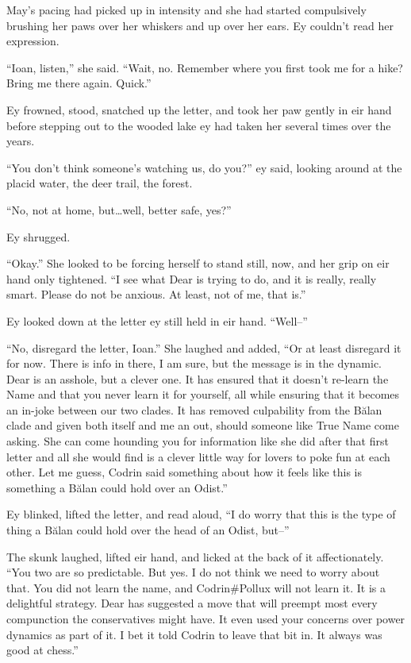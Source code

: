 May's pacing had picked up in intensity and she had started compulsively brushing her paws over her whiskers and up over her ears. Ey couldn't read her expression.

``Ioan, listen,'' she said. ``Wait, no. Remember where you first took me for a hike? Bring me there again. Quick.''

Ey frowned, stood, snatched up the letter, and took her paw gently in eir hand before stepping out to the wooded lake ey had taken her several times over the years.

``You don't think someone's watching us, do you?'' ey said, looking around at the placid water, the deer trail, the forest.

``No, not at home, but\ldots well, better safe, yes?''

Ey shrugged.

``Okay.'' She looked to be forcing herself to stand still, now, and her grip on eir hand only tightened. ``I see what Dear is trying to do, and it is really, really smart. Please do not be anxious. At least, not of me, that is.''

Ey looked down at the letter ey still held in eir hand. ``Well--''

``No, disregard the letter, Ioan.'' She laughed and added, ``Or at least disregard it for now. There is info in there, I am sure, but the message is in the dynamic. Dear is an asshole, but a clever one. It has ensured that it doesn't re-learn the Name and that you never learn it for yourself, all while ensuring that it becomes an in-joke between our two clades. It has removed culpability from the Bălan clade and given both itself and me an out, should someone like True Name come asking. She can come hounding you for information like she did after that first letter and all she would find is a clever little way for lovers to poke fun at each other. Let me guess, Codrin said something about how it feels like this is something a Bălan could hold over an Odist.''

Ey blinked, lifted the letter, and read aloud, ``I do worry that this is the type of thing a Bălan could hold over the head of an Odist, but--''

The skunk laughed, lifted eir hand, and licked at the back of it affectionately. ``You two are so predictable. But yes. I do not think we need to worry about that. You did not learn the name, and Codrin\#Pollux will not learn it. It is a delightful strategy. Dear has suggested a move that will preempt most every compunction the conservatives might have. It even used your concerns over power dynamics as part of it. I bet it told Codrin to leave that bit in. It always was good at chess.''

